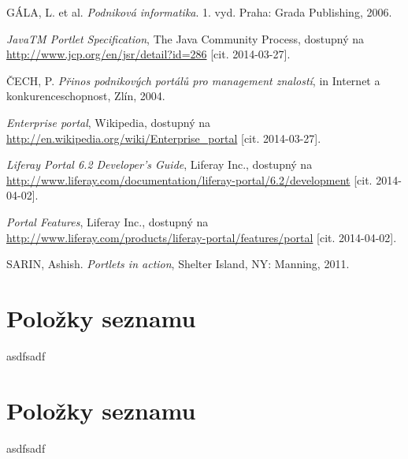 \documentclass{fithesis}
\begin{document}
\begin{thebibliography}{0}

GÁLA, L. et al. \textit{Podniková informatika}. 1. vyd. Praha: Grada Publishing, 2006. 

\textit{JavaTM Portlet Specification}, The Java Community Process, dostupný na \url{http://www.jcp.org/en/jsr/detail?id=286} [cit. 2014-03-27].

ČECH, P. \textit {Přinos podnikových portálů pro management znalostí}, in Internet a konkurenceschopnost, Zlín, 2004.

\textit{Enterprise portal}, Wikipedia, dostupný na \url{http://en.wikipedia.org/wiki/Enterprise_portal} [cit. 2014-03-27].

\textit{Liferay Portal 6.2 Developer's Guide}, Liferay Inc., dostupný na \url{http://www.liferay.com/documentation/liferay-portal/6.2/development} [cit. 2014-04-02].

\textit{Portal Features}, Liferay Inc., dostupný na \url{http://www.liferay.com/products/liferay-portal/features/portal} [cit. 2014-04-02].

SARIN, Ashish. \textit{Portlets in action}, Shelter Island, NY: Manning, 2011.






\end{thebibliography}


\newpage
\appendix
\chapter{Položky seznamu}
asdfsadf

\chapter{Položky seznamu}
asdfsadf
\end{document}

